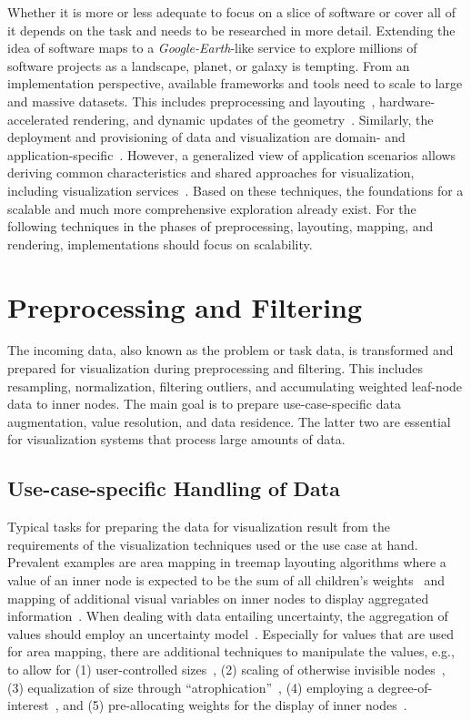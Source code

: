 \documentclass{svjour3}                     %
\begin{document}
Whether it is more or less adequate to focus on a slice of software or cover all of it depends on the task and needs to be researched in more detail.
Extending the idea of software maps to a \emph{Google-Earth}-like service to explore millions of software projects as a landscape, planet, or galaxy is tempting.
From an implementation perspective, available frameworks and tools need to scale to large and massive datasets.
This includes preprocessing and layouting~\citep{scheibel2021-hilbertmooreperformance}, hardware-accelerated rendering, and dynamic updates of the geometry~\citep{trapp2013-gputreemaps,scheibel2016-avcs}.
Similarly, the deployment and provisioning of data and visualization are domain- and application-specific~\citep{limberger2013-interactive,limberger2016-declarative3d}.
However, a generalized view of application scenarios allows deriving common characteristics and shared approaches for visualization, including visualization services~\citep{scheibel2020-modular-hiviser}.
Based on these techniques, the foundations for a scalable and much more comprehensive exploration already exist.
For the following techniques in the phases of preprocessing, layouting, mapping, and rendering, implementations should focus on scalability.

\section{Preprocessing and Filtering}
\label{JOV:Sec:Preprocessing}
The incoming data, also known as the problem or task data, is transformed and prepared for visualization during preprocessing and filtering.
This includes resampling, normalization, filtering outliers, and accumulating weighted leaf-node data to inner nodes.
The main goal is to prepare use-case-specific data augmentation, value resolution, and data residence.
The latter two are essential for visualization systems that process large amounts of data.

\subsection{Use-case-specific Handling of Data}
Typical tasks for preparing the data for visualization result from the requirements of the visualization techniques used or the use case at hand.
Prevalent examples are area mapping in treemap layouting algorithms where a value of an inner node is expected to be the sum of all children's weights~\citep{johnson1991-spacefilling} and mapping of additional visual variables on inner nodes to display aggregated information~\citep{limberger2017-aggregation}.
When dealing with data entailing uncertainty, the aggregation of values should employ an uncertainty model~\citep{gortler2017-bubbletreemaps}.
Especially for values that are used for area mapping, there are additional techniques to manipulate the values, e.g., to allow for (1) user-controlled sizes~\citep{turo1994-basketball}, (2) scaling of otherwise invisible nodes~\citep{csallner2003-diversification}, (3) equalization of size through \enquote{atrophication}~\citep{bladh2004-threedimensions}, (4) employing a degree-of-interest~\citep{schlechtweg2004-interactive}, and (5) pre-allocating weights for the display of inner nodes~\citep{yang2015-cabinettree}.
\end{document}
